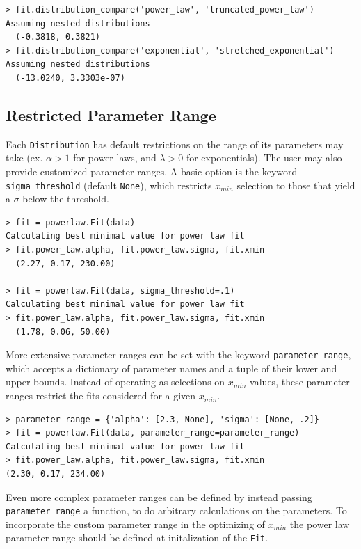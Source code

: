 \documentclass[10pt]{article}
\begin{document}
\begin{verbatim}
> fit.distribution_compare('power_law', 'truncated_power_law')
Assuming nested distributions
  (-0.3818, 0.3821)
> fit.distribution_compare('exponential', 'stretched_exponential')
Assuming nested distributions
  (-13.0240, 3.3303e-07)
\end{verbatim}

\subsection*{Restricted Parameter Range}\label{FittingMethodology}
Each \verb$Distribution$ has default restrictions on the range of its parameters may take (ex. $\alpha > 1$ for power laws, and $\lambda > 0$ for exponentials). The user may also provide customized parameter ranges. A basic option is the keyword \verb$sigma_threshold$ (default \verb$None$), which restricts $x_{min}$ selection to those that yield a $\sigma$ below the threshold. 

\begin{verbatim}
> fit = powerlaw.Fit(data)
Calculating best minimal value for power law fit
> fit.power_law.alpha, fit.power_law.sigma, fit.xmin
  (2.27, 0.17, 230.00)
  
> fit = powerlaw.Fit(data, sigma_threshold=.1)
Calculating best minimal value for power law fit
> fit.power_law.alpha, fit.power_law.sigma, fit.xmin
  (1.78, 0.06, 50.00)  
\end{verbatim}

More extensive parameter ranges can be set with the keyword \verb$parameter_range$, which accepts a dictionary of parameter names and a tuple of their lower and upper bounds. Instead of operating as selections on $x_{min}$ values, these parameter ranges restrict the fits considered for a given $x_{min}$.

\begin{verbatim}
> parameter_range = {'alpha': [2.3, None], 'sigma': [None, .2]}
> fit = powerlaw.Fit(data, parameter_range=parameter_range)
Calculating best minimal value for power law fit
> fit.power_law.alpha, fit.power_law.sigma, fit.xmin
(2.30, 0.17, 234.00)
\end{verbatim}

Even more complex parameter ranges can be defined by instead passing \verb$parameter_range$ a function, to do arbitrary calculations on the parameters. To incorporate the custom parameter range in the optimizing of $x_{min}$ the power law parameter range should be defined at initalization of the \verb$Fit$.
 
\end{document}
